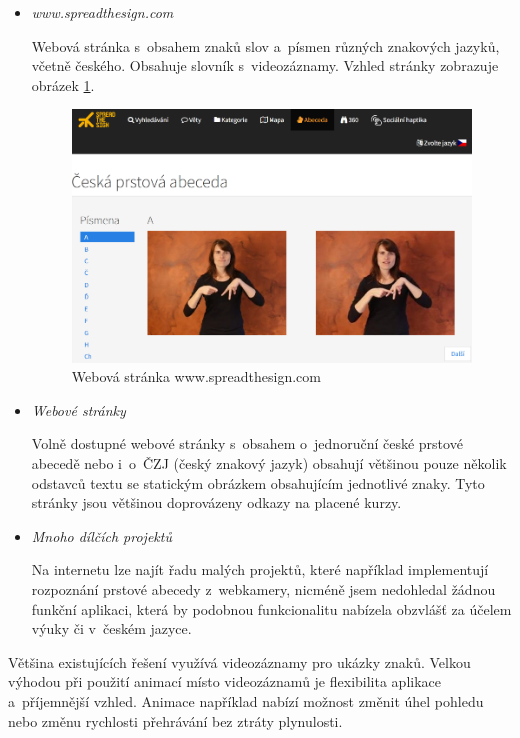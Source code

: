 \documentclass[
  master,
  program=ainfvs,
  biblatex,
  figures=true,
  tables=false,
  sourcecodes=true,
  glossaries,
  index
]{kidiplom}
\begin{document}
\begin{itemize}
            \item \emph{www.spreadthesign.com} \par
                Webová stránka s~obsahem znaků slov a~písmen různých znakových jazyků, včetně českého. Obsahuje slovník s~videozáznamy. Vzhled stránky zobrazuje obrázek \ref{spread-the-sign.com}. \cite{spreadthesign}

            \begin{figure}[htbp]
                \centering
                \includegraphics[width=0.8\columnwidth]{graphics/spread-the-sign.png}
                \caption{Webová stránka www.spreadthesign.com}
                \label{spread-the-sign.com}
            \end{figure}

             \item \emph{Webové stránky} \par
                Volně dostupné webové stránky s~obsahem o~jednoruční české prstové abecedě nebo i~o~ČZJ (český znakový jazyk) obsahují většinou pouze několik odstavců textu se statickým obrázkem obsahujícím jednotlivé znaky. Tyto stránky jsou většinou doprovázeny odkazy na placené kurzy.
                
            \item \emph{Mnoho dílčích projektů} \par
                Na internetu lze najít řadu malých projektů, které například implementují rozpoznání prstové abecedy z~webkamery, nicméně jsem nedohledal žádnou funkční aplikaci, která by podobnou funkcionalitu nabízela obzvlášť za účelem výuky či v~českém jazyce.
        \end{itemize}     


         Většina existujících řešení využívá videozáznamy pro ukázky znaků. Velkou výhodou při použití animací místo videozáznamů je flexibilita aplikace a~příjemnější vzhled. Animace například nabízí možnost změnit úhel pohledu nebo změnu rychlosti přehrávání bez ztráty plynulosti. 
         
\end{document}
